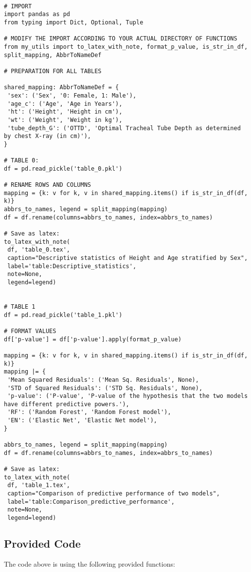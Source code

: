 \documentclass[11pt]{article}
\begin{document}
\begin{verbatim}

# IMPORT
import pandas as pd
from typing import Dict, Optional, Tuple

# MODIFY THE IMPORT ACCORDING TO YOUR ACTUAL DIRECTORY OF FUNCTIONS
from my_utils import to_latex_with_note, format_p_value, is_str_in_df, split_mapping, AbbrToNameDef

# PREPARATION FOR ALL TABLES

shared_mapping: AbbrToNameDef = {
 'sex': ('Sex', '0: Female, 1: Male'),
 'age_c': ('Age', 'Age in Years'),
 'ht': ('Height', 'Height in cm'),
 'wt': ('Weight', 'Weight in kg'),
 'tube_depth_G': ('OTTD', 'Optimal Tracheal Tube Depth as determined by chest X-ray (in cm)'),
}

# TABLE 0:
df = pd.read_pickle('table_0.pkl')

# RENAME ROWS AND COLUMNS 
mapping = {k: v for k, v in shared_mapping.items() if is_str_in_df(df, k)} 
abbrs_to_names, legend = split_mapping(mapping)
df = df.rename(columns=abbrs_to_names, index=abbrs_to_names)

# Save as latex:
to_latex_with_note(
 df, 'table_0.tex',
 caption="Descriptive statistics of Height and Age stratified by Sex", 
 label='table:Descriptive_statistics',
 note=None,
 legend=legend)


# TABLE 1
df = pd.read_pickle('table_1.pkl')

# FORMAT VALUES 
df['p-value'] = df['p-value'].apply(format_p_value)

mapping = {k: v for k, v in shared_mapping.items() if is_str_in_df(df, k)}
mapping |= {
 'Mean Squared Residuals': ('Mean Sq. Residuals', None),
 'STD of Squared Residuals': ('STD Sq. Residuals', None),
 'p-value': ('P-value', 'P-value of the hypothesis that the two models have different predictive powers.'),
 'RF': ('Random Forest', 'Random Forest model'),
 'EN': ('Elastic Net', 'Elastic Net model'),
}

abbrs_to_names, legend = split_mapping(mapping)
df = df.rename(columns=abbrs_to_names, index=abbrs_to_names)

# Save as latex:
to_latex_with_note(
 df, 'table_1.tex',
 caption="Comparison of predictive performance of two models", 
 label='table:Comparison_predictive_performance',
 note=None,
 legend=legend)

\end{verbatim}

\subsection{Provided Code}
The code above is using the following provided functions:
\end{document}
